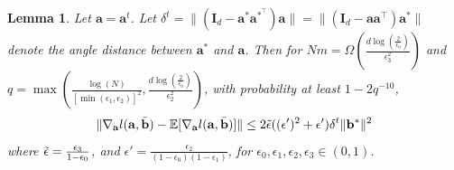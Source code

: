 \documentclass{article}
\theoremstyle{plain}
\newtheorem{lemma}[theorem]{Lemma}
\theoremstyle{definition}
\theoremstyle{remark}
\begin{document}
\begin{lemma} \label{lemma:grad-egrad-bound}
     Let $\mathbf{a} = \mathbf{a}^t$. Let $\delta^t = \lVert (\mathbf{I}_d-\mathbf{a}^*\mathbf{a}^{*^\top})\mathbf{a}\rVert = \lVert (\mathbf{I}_d-\mathbf{a}\mathbf{a}^\top)\mathbf{a}^*\rVert$ denote the angle distance between $\mathbf{a}^{*}$ and $\mathbf{a}$. Then for $Nm=\Omega(\frac{d\log(\frac{2}{\epsilon_0})}{\epsilon_3^2})$ and $q=\max(\frac{\log(N)}{[\min(\epsilon_1,\epsilon_2)]^2},\frac{d\log(\frac{2}{\epsilon_0})}{\epsilon_2^2})$, with probability at least $1-2q^{-10}$,
    \begin{align}
        \lVert  \nabla_{\mathbf{a}}l(\mathbf{a},\Bar{\mathbf{b}})-\mathbb{E}[\nabla_{\mathbf{a}}l(\mathbf{a},\Bar{\mathbf{b}})]\rVert \leq 2\Tilde{\epsilon} ((\epsilon')^2+\epsilon')\delta^{t}\lVert \mathbf{b}^*\rVert^2 
    \end{align}
    where $\Tilde{\epsilon} = \frac{\epsilon_3}{1-\epsilon_0}$, and $\epsilon' = \frac{\epsilon_2}{(1-\epsilon_0)(1-\epsilon_{1})}$, for $\epsilon_0,\epsilon_1,\epsilon_2,\epsilon_3 \in (0,1)$.
\end{lemma}
\end{document}
